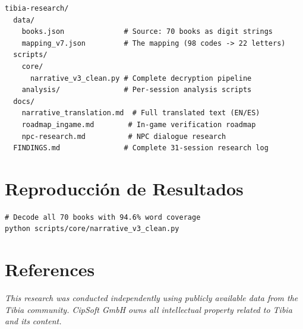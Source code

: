 \documentclass[11pt,a4paper]{article}
\begin{document}
\begin{lstlisting}[style=plain]
tibia-research/
  data/
    books.json              # Source: 70 books as digit strings
    mapping_v7.json         # The mapping (98 codes -> 22 letters)
  scripts/
    core/
      narrative_v3_clean.py # Complete decryption pipeline
    analysis/               # Per-session analysis scripts
  docs/
    narrative_translation.md  # Full translated text (EN/ES)
    roadmap_ingame.md        # In-game verification roadmap
    npc-research.md          # NPC dialogue research
  FINDINGS.md               # Complete 31-session research log
\end{lstlisting}

\section{Reproducci\'{o}n de Resultados}

\begin{lstlisting}[style=bash]
# Decode all 70 books with 94.6% word coverage
python scripts/core/narrative_v3_clean.py
\end{lstlisting}

\section*{References}

\textit{This research was conducted independently using publicly available data from the Tibia community. CipSoft GmbH owns all intellectual property related to Tibia and its content.}
\end{document}
